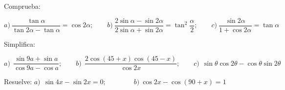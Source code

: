 \vspace{-8mm}
\begin{flushright}
\begin{footnotesize} \textcolor{gris}{}	\end{footnotesize}
\end{flushright}

\begin{mipropuesto}

 Comprueba: 
 
 \vspace{2mm}$a)\ \dfrac{\tan \alpha}{\tan 2 \alpha-\tan \alpha}=\cos 2 \alpha;\qquad b)\ \dfrac{2\sin \alpha-\sin 2 \alpha}{2\sin \alpha+\sin 2 \alpha}=\tan^2 \dfrac \alpha 2;\qquad c)\ \dfrac{\sin 2\alpha}{1+\cos 2\alpha}=\tan \alpha$ 

\end{mipropuesto}

\vspace{-8mm}
\begin{flushright}
\begin{footnotesize} \textcolor{gris}{}	\end{footnotesize}
\end{flushright}


\begin{mipropuesto}

Simplifica: 

\vspace{2mm} $a)\ \ \dfrac{\sin 9a+\sin a}{\cos 9a-\cos a};\qquad b)\ \ \dfrac{2\cos(45+x) \cos(45-x)}{\cos 2x} ;\qquad c)\ \ \sin \theta \cos 2 \theta -\cos \theta \sin 2\theta$

\end{mipropuesto}

\vspace{-8mm}
\begin{flushright}
\begin{footnotesize} \textcolor{gris}{}	\end{footnotesize}
\end{flushright}


\begin{mipropuesto}

Resuelve: $ a)\ \ \sin 4 x -\sin 2 x =0;\qquad \qquad b)\ \cos 2x-\cos(90+x)=1$

\end{mipropuesto}

